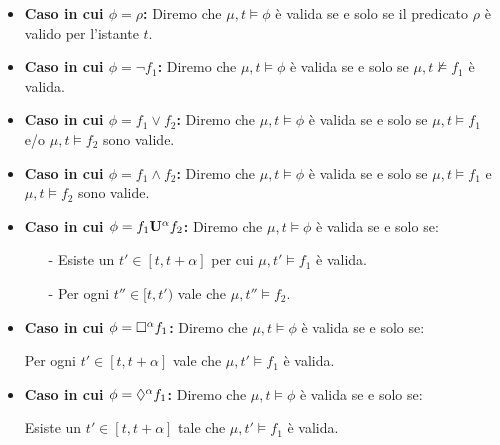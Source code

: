 \documentclass[10pt,a4paper]{article}
\begin{document}
	
	\begin{itemize}
		\item \textbf{Caso in cui $\phi = \rho$:}
		\newline{}
		Diremo che $\mu,t \models \phi$ è valida se e solo se il predicato $\rho$ è valido per l'istante $t$.
		
		\item \textbf{Caso in cui $\phi=\lnot f_1$:}
		\newline{}
		Diremo che $\mu,t \models \phi$ è valida se e solo se $\mu,t\not\models f_1$ è valida.
		
		\item \textbf{Caso in cui $\phi=f_1\lor f_2$:}
		\newline{}
		Diremo che $\mu,t \models \phi$ è valida se e solo se $\mu,t\models f_1$ e/o $\mu,t\models f_2$ sono valide.
		
		\item \textbf{Caso in cui $\phi=f_1\land f_2$:}
		\newline{}
		Diremo che $\mu,t \models \phi$ è valida se e solo se $\mu,t\models f_1$ e $\mu,t\models f_2$ sono valide.
		
		\item \textbf{Caso in cui $\phi=f_1\mathbf{U^{\alpha}} f_2$:}
		\newline{}
		Diremo che $\mu,t \models \phi$ è valida se e solo se:
		\begin{itemize}
			\item [-] Esiste un  $t'\in [t,t+\alpha]$ per cui $\mu,t'\models f_1$ è valida.
			\item [-] Per ogni $t'' \in [t,t')$ vale che $\mu,t''\models f_2$.
		\end{itemize}
	
		\item \textbf{Caso in cui $\phi=\Box^{\alpha}f_1$:}
		\newline{}
		Diremo che $\mu,t \models \phi$ è valida se e solo se:
		\begin{center}
			Per ogni $t'\in [t,t+\alpha]$ vale che  $\mu,t'\models f_1$ è valida.
		\end{center}
	
		\item \textbf{Caso in cui $\phi=\Diamond^{\alpha}f_1$:}
		\newline{}
		Diremo che $\mu,t \models \phi$ è valida se e solo se:
		\begin{center}
			Esiste un $t'\in [t,t+\alpha]$ tale che  $\mu,t'\models f_1$ è valida.
		\end{center}
			
	\end{itemize}
\end{document}
